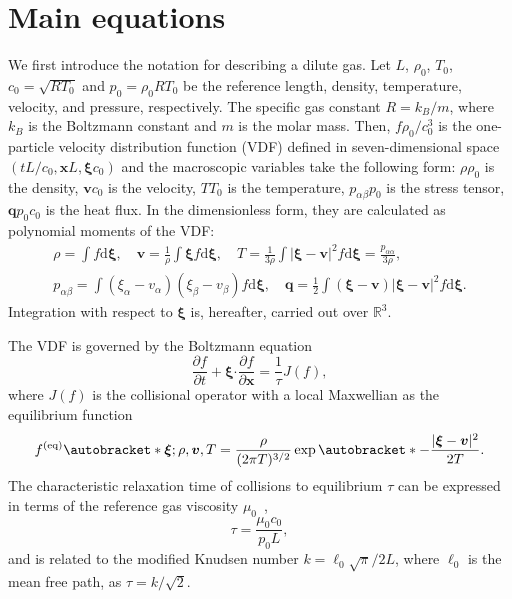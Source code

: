 \documentclass{elsarticle} %
\newcommand{\dd}{\mathrm{d}}
\newcommand{\pder}[2][]{\frac{\partial#1}{\partial#2}}
\DeclarePairedDelimiter\autobracket()       %
\newcommand{\br}[1]{\autobracket*{#1}}
\newcommand{\dxi}{\dd{\boldsymbol{\xi}}}
\newcommand{\bxi}{\boldsymbol{\xi}}
\newcommand{\bv}{\boldsymbol{v}}
\newcommand{\bq}{\boldsymbol{q}}
\newcommand{\bdot}{\boldsymbol{\cdot}}
\newcommand{\bx}{\boldsymbol{x}}
\newcommand{\equil}[1]{#1^\mathrm{(eq)}}
\newcommand{\refer}[1]{#1_0}
\begin{document}
\section{Main equations}\label{sec:equations}

We first introduce the notation for describing a dilute gas.
Let \(L\), \(\refer\rho\), \(\refer{T}\), \(\refer{c} = \sqrt{R\refer{T}}\) and \(\refer{p} = \refer{\rho}R\refer{T}\) be
the reference length, density, temperature, velocity, and pressure, respectively.
The specific gas constant \(R = k_B/m\), where \(k_B\) is the Boltzmann constant and \(m\) is the molar mass.
Then, \(f\refer{\rho}/\refer{c}^3\) is the one-particle velocity distribution function (VDF)
defined in seven-dimensional space \((tL/\refer{c}, \bx L, \bxi \refer{c})\) and
the macroscopic variables take the following form:
\(\rho\refer{\rho}\) is the density, \(\bv\refer{c}\) is the velocity, \(T\refer{T}\) is the temperature,
\(p_{\alpha\beta}\refer{p}\) is the stress tensor, \(\bq\refer{p}\refer{c}\) is the heat flux.
In the dimensionless form, they are calculated as polynomial moments of the VDF:
\begin{equation}\label{eq:macro}
    \begin{gathered}
    \rho = \int f \dxi, \quad
    \bv = \frac1{\rho} \int \bxi f \dxi, \quad
    T = \frac{1}{3\rho}\int|\bxi-\bv|^2f \dxi = \frac{p_{\alpha\alpha}}{3\rho}, \\
    p_{\alpha\beta} = \int(\xi_\alpha - v_\alpha)(\xi_\beta - v_\beta) f \dxi, \quad
    \bq = \frac12\int(\bxi-\bv)|\bxi-\bv|^2 f \dxi.
    \end{gathered}
\end{equation}
Integration with respect to \(\bxi\) is, hereafter, carried out over \(\mathbb{R}^3\).

The VDF is governed by the Boltzmann equation
\begin{equation}\label{eq:Boltzmann}
    \pder[f]{t} + \bxi\bdot\pder[f]{\bx} = \frac{1}{\tau} J(f),
\end{equation}
where \(J(f)\) is the collisional operator with a local Maxwellian as the equilibrium function
\begin{equation}\label{eq:equilibrium}
    \equil{f}\br{\bxi; \rho, \bv, T} = \frac{\rho}{(2\pi T)^{3/2}}\exp\br{-\frac{|\bxi-\bv|^2}{2T}}.
\end{equation}
The characteristic relaxation time of collisions to equilibrium \(\tau\)
can be expressed in terms of the reference gas viscosity \(\refer\mu\)~\cite{Cercignani2000, Sone2007},
\begin{equation}\label{eq:tau}
    \tau = \frac{\refer\mu\refer{c}}{\refer{p}L},
\end{equation}
and is related to the modified Knudsen number \(k=\ell_0\sqrt\pi/2L\), where \(\ell_0\) is the mean free path,
as \(\tau = k / \sqrt2\).
\end{document}
